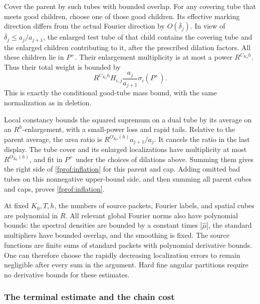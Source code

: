 Cover the parent by such tubes with bounded overlap. For any covering
tube that meets good children, choose one of those good children. Its
effective marking direction differs from the actual Fourier direction
by \(O(\overline\delta_j)\). In view of
\(\overline\delta_j\leq a_j/a_{j+1}\), the enlarged test tube of that
child contains the covering tube and the enlarged children contributing
to it, after the prescribed dilation factors. All these children lie
in \(P^+\). Their enlargement multiplicity is at most a power
\(R^{C_{K_0}h}\). Thus their total weight is bounded by
$$
 R^{C_{K_0}h}H_{i,j}\frac{a_j}{a_{j+1}}\sigma_i(P^+).
$$
This is exactly the conditional good-tube mass bound, with the same
normalization as in deletion.

Local constancy bounds the squared supremum on a dual tube by its
average on an \(R^h\)-enlargement, with a small-power loss and rapid
tails. Relative to the parent average, the area ratio is
\(R^{O_{K_0}(h)}a_{j+1}/a_j\). It cancels the ratio in the last
display. The tube cover and its enlarged localizations have multiplicity
at most \(R^{O_{K_0}(h)}\), and fit in \(P^+\) under the choices of
dilations above. Summing them gives the right side of
\eqref{fprof:inflation} for this parent and cap. Adding omitted bad
tubes on this nonnegative upper-bound side, and then summing all parent
cubes and caps, proves \eqref{fprof:inflation}.

At fixed \(K_0,T,h\), the numbers of source packets, Fourier labels,
and spatial cubes are polynomial in \(R\). All relevant global Fourier
norms also have polynomial bounds: the spectral densities are bounded
by a constant times \(|\widehat\mu|\), the standard multipliers have
bounded overlap, and the smoothing is fixed. The source functions are
finite sums of standard packets with polynomial derivative bounds.
One can therefore choose the rapidly decreasing localization errors to
remain negligible after every sum in the argument. Hard fine angular
partitions require no derivative bounds for these estimates.

\subsubsection*{The terminal estimate and the chain cost}

